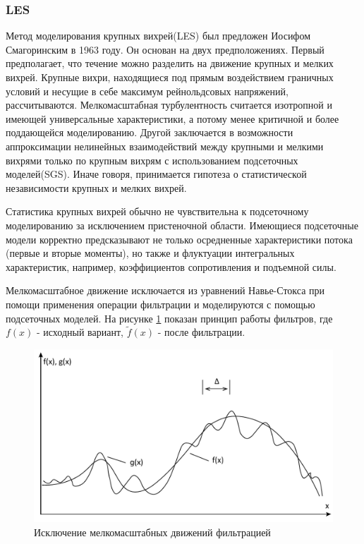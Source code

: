 \documentclass[a4paper]{article}
\begin{document}
			
	\subsubsection{LES}
	
		Метод моделирования крупных вихрей(LES) был предложен Иосифом Смагоринским в 1963 году. Он основан на двух предположениях. Первый предполагает, что течение можно разделить на движение крупных и мелких вихрей. Крупные вихри, находящиеся под прямым воздействием граничных условий и несущие в себе максимум рейнольдсовых напряжений, рассчитываются. Мелкомасштабная турбулентность считается изотропной и имеющей универсальные характеристики, а потому менее критичной и более поддающейся моделированию. Другой  заключается в возможности аппроксимации нелинейных взаимодействий между крупными и мелкими вихрями только по крупным вихрям с использованием подсеточных моделей(SGS). Иначе говоря, принимается гипотеза о статистической независимости крупных и мелких вихрей.
	
		Статистика крупных вихрей обычно не чувствительна к подсеточному моделированию за исключением пристеночной области. Имеющиеся подсеточные модели корректно предсказывают не только осредненные характеристики потока (первые и вторые моменты), но также и флуктуации интегральных характеристик, например, коэффициентов сопротивления и подъемной силы\cite{Fureby2000}.
	
		Мелкомасштабное движение исключается из уравнений Навье-Стокса при помощи применения операции фильтрации и моделируются с помощью подсеточных моделей. На рисунке \ref{fig:lesfilter} показан принцип работы фильтров, где $f(x)$ - исходный вариант, $\tilde{f}(x)$ - после фильтрации.\\
		\begin{figure}[H]
			\centering
			\includegraphics[width=0.7\linewidth]{../Assets/ФильтрацияLES}
			\caption{Исключение мелкомасштабных движений фильтрацией}
			\label{fig:lesfilter}
		\end{figure}
	
\end{document}
